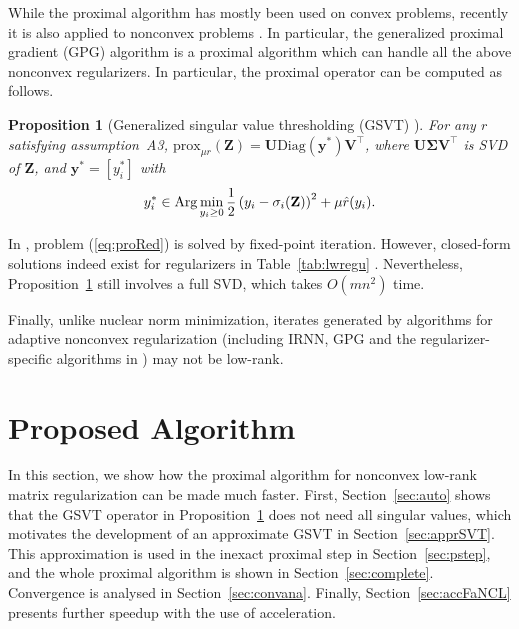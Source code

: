 \documentclass[10pt,journal,compsoc]{IEEEtran}
\newtheorem{prop}[theorem]{Proposition}
\newcommand{\Prox}[2]{\text{prox}_{#1}(#2)}
\newcommand{\Diag}[1]{\text{Diag}(#1)}
\begin{document}
While the proximal algorithm has mostly been used  on convex problems, 
recently it is also applied to nonconvex problems \cite{sun2013robust,hu2013fast,lu2016nonconvex,lu2015generalized,gu2016weighted,oh2016partial}.
In particular, the generalized proximal gradient (\textsf{GPG}) algorithm \cite{lu2015generalized} is a 
proximal algorithm which can handle all the above nonconvex regularizers.
In particular, 
the proximal operator
can be computed as follows.

\begin{prop} [Generalized singular value thresholding (GSVT) 
\cite{lu2015generalized}] 
\label{pr:proxReduce}
For any $r$ satisfying assumption~A3, 
$\Prox{\mu r}{\mathbf{Z}} = \mathbf{U}\Diag{\mathbf{y}^*} \mathbf{V}^{\top}$, where $\mathbf{U} \mathbf{\Sigma} \mathbf{V}^{\top}$ is SVD of $\mathbf{Z}$, 
and $\mathbf{y}^*= [y^*_i]$ with
\begin{equation} 
\label{eq:proRed}
y_i^* \in \text{\normalfont Arg}
\min_{y_i \ge 0} \frac{1}{2} \left(y_i - \sigma_i(\mathbf{Z})\right)^2 + \mu \hat{r}(y_i).
\end{equation}
\end{prop}

In \cite{lu2015generalized}, problem (\ref{eq:proRed}) is solved by fixed-point iteration.
However,
closed-form solutions 
indeed
exist for regularizers in Table~\ref{tab:lwregu}
\cite{gongZLHY2013}.
Nevertheless,
Proposition~\ref{pr:proxReduce}
still involves a full SVD,
which takes $O(m n^2)$ time.

Finally,
unlike nuclear norm minimization,
iterates generated by
algorithms for adaptive nonconvex regularization
(including 
\textsf{IRNN},
\textsf{GPG} and
the regularizer-specific algorithms in 
\cite{sun2013robust, hu2013fast,oh2016partial})
may not be low-rank.



\section{Proposed Algorithm}
\label{sec:proalg}
 
In this section, we show how the proximal algorithm for
nonconvex low-rank matrix regularization
can be made much faster.
First, 
Section~\ref{sec:auto}
shows that
the GSVT operator in Proposition~\ref{pr:proxReduce}
does not need
all singular values, which
motivates the development of an approximate GSVT in Section~\ref{sec:apprSVT}.
This approximation is used in the inexact proximal step in Section~\ref{sec:pstep},
and the whole proximal algorithm is shown in Section~\ref{sec:complete}.
Convergence is analysed in Section~\ref{sec:convana}.
Finally, Section~\ref{sec:accFaNCL} presents 
further speedup with the use of acceleration.
\end{document}
